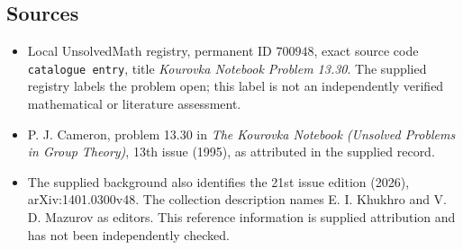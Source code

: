 \documentclass[11pt]{article}
\begin{document}
\subsection{Sources}
\begin{itemize}
\item Local UnsolvedMath registry, permanent ID \(700948\), exact source code \texttt{catalogue entry}, title \emph{Kourovka Notebook Problem 13.30}. The supplied registry labels the problem open; this label is not an independently verified mathematical or literature assessment.
\item P. J. Cameron, problem 13.30 in \emph{The Kourovka Notebook (Unsolved Problems in Group Theory)}, 13th issue (1995), as attributed in the supplied record.
\item The supplied background also identifies the 21st issue edition (2026), arXiv:1401.0300v48. The collection description names E. I. Khukhro and V. D. Mazurov as editors. This reference information is supplied attribution and has not been independently checked.
\end{itemize}
\end{document}
